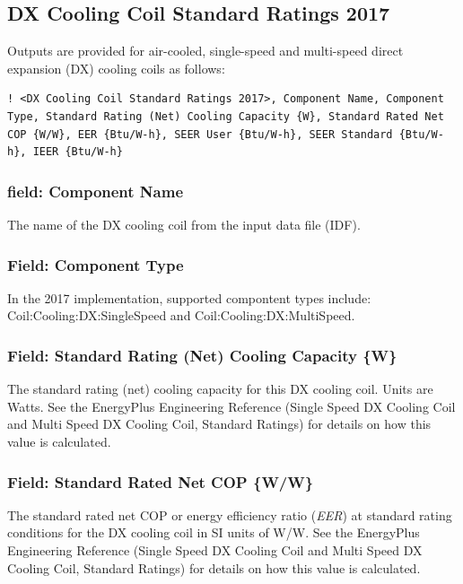 \subsection{DX Cooling Coil Standard Ratings 2017}\label{dx-cooling-coil-standard-ratings-2017}

Outputs are provided for air-cooled, single-speed and multi-speed direct expansion (DX) cooling coils as follows:

\begin{lstlisting}
! <DX Cooling Coil Standard Ratings 2017>, Component Name, Component Type, Standard Rating (Net) Cooling Capacity {W}, Standard Rated Net COP {W/W}, EER {Btu/W-h}, SEER User {Btu/W-h}, SEER Standard {Btu/W-h}, IEER {Btu/W-h}
\end{lstlisting}

\subsubsection{field: Component Name}\label{field-component-name-4}

The name of the DX cooling coil from the input data file (IDF).

\subsubsection{Field: Component Type}\label{field-component-type-4}

In the 2017 implementation, supported compontent types include: Coil:Cooling:DX:SingleSpeed and Coil:Cooling:DX:MultiSpeed.

\subsubsection{Field: Standard Rating (Net) Cooling Capacity \{W\}}

The standard rating (net) cooling capacity for this DX cooling coil. Units are Watts. See the EnergyPlus Engineering Reference (Single Speed DX Cooling Coil and Multi Speed DX Cooling Coil, Standard Ratings) for details on how this value is calculated.

\subsubsection{Field: Standard Rated Net COP \{W/W\}}

The standard rated net COP or energy efficiency ratio (\emph{EER}) at standard rating conditions for the DX cooling coil in SI units of W/W. See the EnergyPlus Engineering Reference (Single Speed DX Cooling Coil and Multi Speed DX Cooling Coil, Standard Ratings) for details on how this value is calculated.

